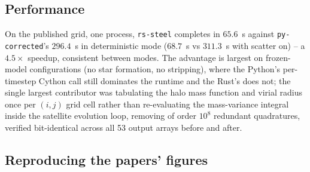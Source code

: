 \documentclass[fleqn,usenatbib]{mnras}
\begin{document}
\subsection{Performance}

On the published grid, one process, \texttt{rs-steel} completes in
$65.6$~s against \texttt{py-corrected}'s $296.4$~s in deterministic mode
($68.7$~s vs $311.3$~s with scatter on) -- a $4.5\times$ speedup,
consistent between modes. The advantage is largest on frozen-model
configurations (no star formation, no stripping), where the Python's
per-timestep Cython call still dominates the runtime and the Rust's does
not; the single largest contributor was tabulating the halo mass function
and virial radius once per $(i,j)$ grid cell rather than re-evaluating
the mass-variance integral inside the satellite evolution loop, removing
of order $10^8$ redundant quadratures, verified bit-identical across all
53 output arrays before and after.

\subsection{Reproducing the papers' figures}
\label{sec:figures}
\end{document}
